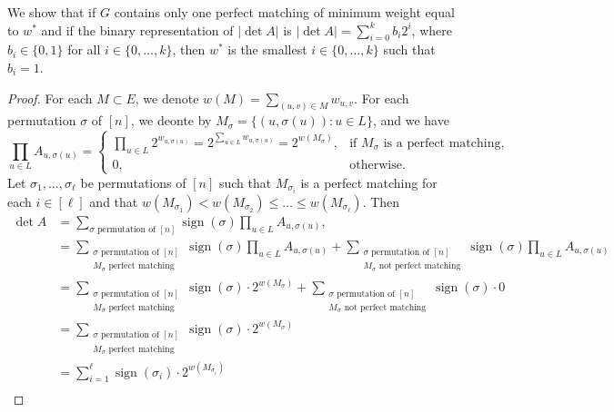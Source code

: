 \documentclass[letterpaper, reqno,11pt]{article}
\DeclareMathOperator{\sign}{sign}
\begin{document}
\begin{enumerate}
\begin{enumerate}
    \bigskip

    We show that if $G$ contains only one perfect matching of minimum weight equal to $w^*$ and if the binary representation of $|\det A|$ is $|\det A| = \sum_{i = 0}^k b_i 2^i$, where $b_i \in \{ 0, 1 \}$ for all $i \in \{ 0, \ldots, k \}$, then $w^*$ is the smallest $i \in \{ 0, \ldots, k \}$ such that $b_i = 1$.

    \begin{proof}
      For each $M \subset E$, we denote $w(M) = \sum_{(u, v) \in M} w_{u, v}$. For each permutation $\sigma$ of $[n]$, we deonte by $M_\sigma = \{ (u, \sigma(u)) : u \in L \}$, and we have
      $$ \prod_{u \in L} A_{u, \sigma(u)} = \left\{
        \begin{array}{ll}
          \prod_{u \in L} 2^{w_{u, \sigma(u)}} = 2^{\sum_{u \in L} w_{u, \sigma(u)}} = 2^{w\left(M_\sigma\right)}, & \text{if $M_\sigma$ is a perfect matching}, \\
          0, & \text{otherwise}.
        \end{array}
      \right. $$
      Let $\sigma_1, \ldots, \sigma_\ell$ be permutations of $[n]$ such that $M_{\sigma_i}$ is a perfect matching for each $i \in [\ell]$ and that $w(M_{\sigma_1}) < w(M_{\sigma_2}) \leq \ldots \leq w(M_{\sigma_\ell})$. Then
      \begin{align*}
        \det A &= \sum_{\text{$\sigma$ permutation of $[n]$}} \sign(\sigma) \prod_{u \in L} A_{u, \sigma(u)}, \\
        &= \sum_{\substack{\text{$\sigma$ permutation of $[n]$} \\ \text{$M_\sigma$ perfect matching}}} \sign(\sigma) \prod_{u \in L} A_{u, \sigma(u)} + \sum_{\substack{\text{$\sigma$ permutation of $[n]$} \\ \text{$M_\sigma$ not perfect matching}}} \sign(\sigma) \prod_{u \in L} A_{u, \sigma(u)} \\
        &= \sum_{\substack{\text{$\sigma$ permutation of $[n]$} \\ \text{$M_\sigma$ perfect matching}}} \sign(\sigma) \cdot 2^{w\left(M_\sigma\right)} + \sum_{\substack{\text{$\sigma$ permutation of $[n]$} \\ \text{$M_\sigma$ not perfect matching}}} \sign(\sigma) \cdot 0 \\
        &= \sum_{\substack{\text{$\sigma$ permutation of $[n]$} \\ \text{$M_\sigma$ perfect matching}}} \sign(\sigma) \cdot 2^{w\left(M_\sigma\right)} \\
        &= \sum_{i = 1}^\ell \sign\left(\sigma_i\right) \cdot 2^{w\left(M_{\sigma_i}\right)} \\

\end{align*}
\end{proof}
\end{enumerate}
\end{enumerate}
\end{document}
